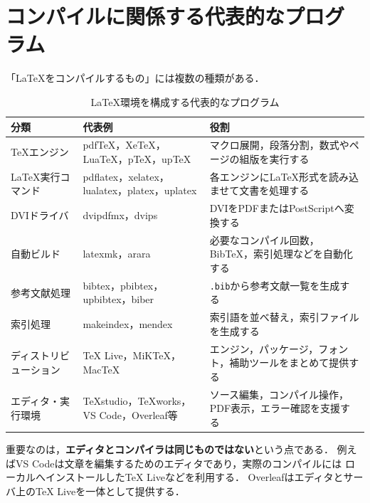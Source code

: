 \documentclass[a4paper,11pt]{jsarticle}
\newcommand{\code}[1]{\texttt{#1}}
\begin{document}
\clearpage
\section{コンパイルに関係する代表的なプログラム}

「LaTeXをコンパイルするもの」には複数の種類がある．

\begin{table}[H]
  \centering
  \small
  \caption{LaTeX環境を構成する代表的なプログラム}
  \begin{tabular}{|>{\raggedright\arraybackslash}p{28mm}
                  |>{\raggedright\arraybackslash}p{48mm}
                  |>{\raggedright\arraybackslash}p{64mm}|}
    \hline
    分類 & 代表例 & 役割 \\
    \hline
    TeXエンジン & pdfTeX，XeTeX，LuaTeX，pTeX，upTeX & マクロ展開，段落分割，数式やページの組版を実行する \\
    \hline
    LaTeX実行コマンド & pdflatex，xelatex，lualatex，platex，uplatex & 各エンジンにLaTeX形式を読み込ませて文書を処理する \\
    \hline
    DVIドライバ & dvipdfmx，dvips & DVIをPDFまたはPostScriptへ変換する \\
    \hline
    自動ビルド & latexmk，arara & 必要なコンパイル回数，BibTeX，索引処理などを自動化する \\
    \hline
    参考文献処理 & bibtex，pbibtex，upbibtex，biber & \code{.bib}から参考文献一覧を生成する \\
    \hline
    索引処理 & makeindex，mendex & 索引語を並べ替え，索引ファイルを生成する \\
    \hline
    ディストリビューション & TeX Live，MiKTeX，MacTeX & エンジン，パッケージ，フォント，補助ツールをまとめて提供する \\
    \hline
    エディタ・実行環境 & TeXstudio，TeXworks，VS Code，Overleaf等 & ソース編集，コンパイル操作，PDF表示，エラー確認を支援する \\
    \hline
  \end{tabular}
\end{table}

重要なのは，\textbf{エディタとコンパイラは同じものではない}という点である．
例えばVS Codeは文章を編集するためのエディタであり，実際のコンパイルには
ローカルへインストールしたTeX Liveなどを利用する．
Overleafはエディタとサーバ上のTeX Liveを一体として提供する．

\clearpage
\end{document}
